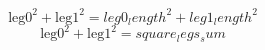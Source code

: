 \[\text{{{leg0}}}^{{2}}+\text{{{leg1}}}^{{2}}={leg0_length}^{{2}}+{leg1_length}^{{2}}\]
\[\text{{{leg0}}}^{{2}}+\text{{{leg1}}}^{{2}}={square_legs_sum}\]
